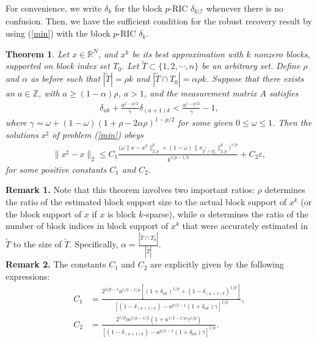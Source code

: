 \documentclass[11pt]{article}
\newtheorem{theorem}{Theorem}
\begin{document}
For convenience, we write $\delta_k$ for the block $p$-RIC $\delta_{k|\mathcal{I}}$ whenever there is no confusion. Then, we have the sufficient condition for the robust recovery result by using (\ref{min}) with the block $p$-RIC $\delta_k$.\\

\begin{theorem} Let $x\in\mathbb{R}^N$, and  $x^k$ be its best approximation with $k$ nonzero blocks, supported on block index set $T_0$. Let $\tilde{T}\subset\{1,2,\cdots,n\}$ be an arbitrary set. Define $\rho$ and $\alpha$ as before such that $|\tilde{T}|=\rho k$ and $|\tilde{T}\cap T_0|=\alpha\rho k$. Suppose that there exists an $a\in\mathbb{Z}$, with $a\geq (1-\alpha)\rho$, $a>1$, and the measurement matrix $A$ satisfies \begin{align}
\delta_{ak}+\frac{a^{1-p/2}}{\gamma}\delta_{(a+1)k}<\frac{a^{1-p/2}}{\gamma}-1, \label{bprip}
\end{align}
where $\gamma=\omega+(1-\omega)(1+\rho-2\alpha\rho)^{1-p/2}$ for some given $0\leq \omega\leq 1$. Then the solutions $x^{\sharp}$ of problem (\ref{min}) obeys
\begin{align}
\lVert x^{\sharp}-x\rVert_2\leq C_1\frac{\Big(\omega\lVert x-x^k\rVert_{2,p}^p+(1-\omega)\lVert x_{\tilde{T}^c\cap T_0^c}\rVert_{2,p}^p\Big)^{1/p}}{k^{1/p-1/2}}+C_2\varepsilon,
\end{align}
for some positive constants $C_1$ and $C_2$. 
\end{theorem}

\noindent
{\bf Remark 1.} Note that this theorem involves two important ratios: $\rho$ determines the ratio of the estimated block support size to the actual block support of $x^k$ (or the block support of $x$ if $x$ is block $k$-sparse), while $\alpha$ determines the ratio of the number of block indices in block support of $x^k$ that were accurately estimated in $\tilde{T}$ to the size of $\tilde{T}$. Specifically, $\alpha=\frac{|\tilde{T}\cap T_0|}{|\tilde{T}|}$.\\

\noindent
{\bf Remark 2.} The constants $C_1$ and $C_2$ are explicitly given by the following expressions:
\begin{align*}
C_1&=\frac{2^{2/p-1}a^{1/2-1/p}\left[(1+\delta_{ak})^{1/p}+(1-\delta_{(a+1)k})^{1/p}\right]}{[(1-\delta_{(a+1)k})-a^{p/2-1}(1+\delta_{ak})\gamma]^{1/p}},\\
C_2&=\frac{2^{1/p}m^{1/p-1/2}(1+a^{1/2-1/p}\gamma^{1/p})}{[(1-\delta_{(a+1)k})-a^{p/2-1}(1+\delta_{ak})\gamma]^{1/p}}.
\end{align*} \\
\end{document}
